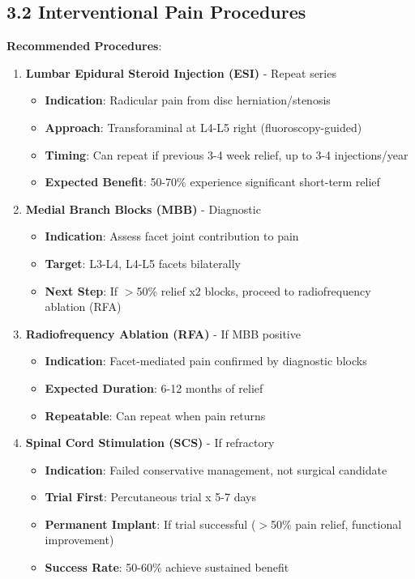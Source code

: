 \documentclass[11pt,letterpaper]{article}
\begin{document}
\subsection*{3.2 Interventional Pain Procedures}

\textbf{Recommended Procedures}:

\begin{enumerate}[leftmargin=*]
    \item \textbf{Lumbar Epidural Steroid Injection (ESI)} - Repeat series
    \begin{itemize}
        \item \textbf{Indication}: Radicular pain from disc herniation/stenosis
        \item \textbf{Approach}: Transforaminal at L4-L5 right (fluoroscopy-guided)
        \item \textbf{Timing}: Can repeat if previous 3-4 week relief, up to 3-4 injections/year
        \item \textbf{Expected Benefit}: 50-70\% experience significant short-term relief
    \end{itemize}

    \item \textbf{Medial Branch Blocks (MBB)} - Diagnostic
    \begin{itemize}
        \item \textbf{Indication}: Assess facet joint contribution to pain
        \item \textbf{Target}: L3-L4, L4-L5 facets bilaterally
        \item \textbf{Next Step}: If $>$50\% relief x2 blocks, proceed to radiofrequency ablation (RFA)
    \end{itemize}

    \item \textbf{Radiofrequency Ablation (RFA)} - If MBB positive
    \begin{itemize}
        \item \textbf{Indication}: Facet-mediated pain confirmed by diagnostic blocks
        \item \textbf{Expected Duration}: 6-12 months of relief
        \item \textbf{Repeatable}: Can repeat when pain returns
    \end{itemize}

    \item \textbf{Spinal Cord Stimulation (SCS)} - If refractory
    \begin{itemize}
        \item \textbf{Indication}: Failed conservative management, not surgical candidate
        \item \textbf{Trial First}: Percutaneous trial x 5-7 days
        \item \textbf{Permanent Implant}: If trial successful ($>$50\% pain relief, functional improvement)
        \item \textbf{Success Rate}: 50-60\% achieve sustained benefit
    \end{itemize}
\end{enumerate}
\end{document}
